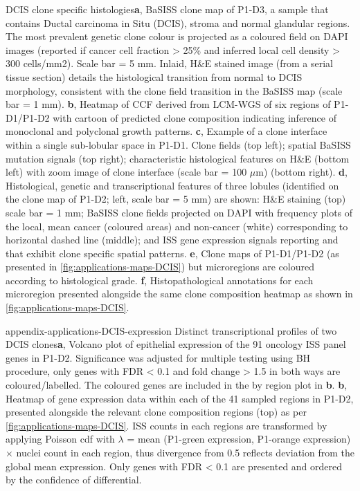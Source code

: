    {DCIS clone specific histologies}{\textbf{a}, \ac{BaSISS} clone map of P1-D3, a sample that contains Ductal carcinoma in Situ (DCIS), stroma and normal glandular regions. The most prevalent genetic clone colour is projected as a coloured field on DAPI images (reported if cancer cell fraction > 25\% and inferred local cell density > 300 cells/mm2). Scale bar = 5 mm. Inlaid, H\&E stained image (from a serial tissue section) details the histological transition from normal to DCIS morphology, consistent with the clone field transition in the \ac{BaSISS} map (scale bar = 1 mm). \textbf{b}, Heatmap of \ac{CCF} derived from \ac{LCM}-\ac{WGS} of six regions of P1-D1/P1-D2 with cartoon of predicted clone composition indicating inference of monoclonal and polyclonal growth patterns. \textbf{c}, Example of a clone interface within a single sub-lobular space in P1-D1. Clone fields (top left); spatial \ac{BaSISS} mutation signals (top right); characteristic histological features on H\&E (bottom left) with zoom image of clone interface (scale bar = 100 $\mu$m) (bottom right). \textbf{d}, Histological, genetic and transcriptional features of three lobules (identified on the clone map of P1-D2; left, scale bar = 5 mm) are shown: H\&E staining (top) scale bar = 1 mm; \ac{BaSISS} clone fields projected on DAPI with frequency plots of the local, mean cancer (coloured areas) and non-cancer (white) corresponding to horizontal dashed line (middle); and \ac{ISS} gene expression signals reporting  and  that exhibit clone specific spatial patterns. \textbf{e}, Clone maps of P1-D1/P1-D2 (as presented in \cref{fig:applications-maps-DCIS}) but microregions are coloured according to histological grade. \textbf{f}, Histopathological annotations for each microregion presented alongside the same clone composition heatmap as shown in \cref{fig:applications-maps-DCIS}.}

    {appendix-applications-DCIS-expression}
    {Distinct transcriptional profiles of two \acs{DCIS} clones}{\textbf{a}, Volcano plot of epithelial expression of the 91 oncology \ac{ISS} panel genes in P1-D2. Significance was adjusted for multiple testing using BH procedure, only genes with \ac{FDR} < 0.1 and fold change > 1.5 in both ways are coloured/labelled. The coloured genes are included in the by region plot in \textbf{b}. \textbf{b}, Heatmap of gene expression data within each of the 41 sampled regions in P1-D2, presented alongside the relevant clone composition regions (top) as per \cref{fig:applications-maps-DCIS}. \ac{ISS} counts in each regions are transformed by applying Poisson cdf with $\lambda$ = mean (P1-green expression, P1-orange expression) $\times$ nuclei count in each region, thus divergence from 0.5 reflects deviation from the global mean expression. Only genes with \ac{FDR} < 0.1 are presented and ordered by the confidence of differential.}

